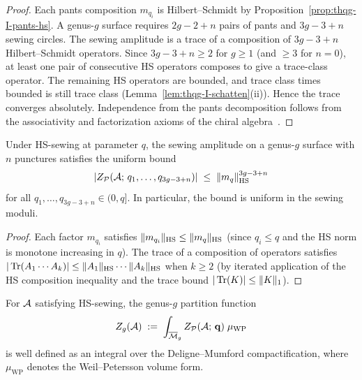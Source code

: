 \begin{proof}
Each pants composition $m_{q_i}$ is Hilbert--Schmidt by Proposition~\ref{prop:thqg-I-pants-hs}. A genus-$g$ surface requires $2g - 2 + n$ pairs of pants and $3g - 3 + n$ sewing circles. The sewing amplitude is a trace of a composition of $3g - 3 + n$ Hilbert--Schmidt operators. Since $3g - 3 + n \geq 2$ for $g \geq 1$ (and $\geq 3$ for $n = 0$), at least one pair of consecutive HS operators composes to give a trace-class operator. The remaining HS operators are bounded, and trace class times bounded is still trace class (Lemma~\ref{lem:thqg-I-schatten}(ii)). Hence the trace converges absolutely. Independence from the pants decomposition follows from the associativity and factorization axioms of the chiral algebra~\cite{BD04, FBZ04}.
\end{proof}

\begin{proposition}
\label{prop:thqg-I-uniform-trace-bound}
Under HS-sewing at parameter $q$, the sewing amplitude on a genus-$g$ surface with $n$ punctures satisfies the uniform bound
\begin{equation}\label{eq:thqg-I-uniform-trace}
|Z_{\mathcal{P}}(\mathcal{A};\,q_1,\ldots,q_{3g-3+n})| \;\leq\; \|m_q\|_{\operatorname{HS}}^{3g-3+n}
\end{equation}
for all $q_1, \ldots, q_{3g-3+n} \in (0,q]$. In particular, the bound is uniform in the sewing moduli.
\end{proposition}

\begin{proof}
Each factor $m_{q_i}$ satisfies $\|m_{q_i}\|_{\operatorname{HS}} \leq \|m_q\|_{\operatorname{HS}}$ (since $q_i \leq q$ and the HS norm is monotone increasing in $q$). The trace of a composition of operators satisfies $|\operatorname{Tr}(A_1 \cdots A_k)| \leq \|A_1\|_{\operatorname{HS}}\cdots\|A_k\|_{\operatorname{HS}}$ when $k \geq 2$ (by iterated application of the HS composition inequality and the trace bound $|\operatorname{Tr}(K)| \leq \|K\|_1$).
\end{proof}

\begin{corollary}
\label{cor:thqg-I-genus-g-partition}
For $\mathcal{A}$ satisfying HS-sewing, the genus-$g$ partition function
\begin{equation}\label{eq:thqg-I-Z-g}
Z_g(\mathcal{A}) \;:=\; \int_{\overline{\mathcal{M}}_g} Z_{\mathcal{P}}(\mathcal{A};\,\mathbf{q}) \;\mu_{\mathrm{WP}}
\end{equation}
is well defined as an integral over the Deligne--Mumford compactification, where $\mu_{\mathrm{WP}}$ denotes the Weil--Petersson volume form.
\end{corollary}

